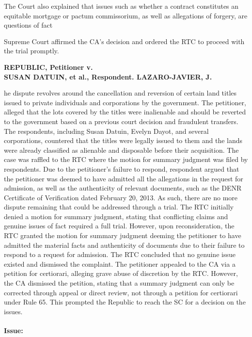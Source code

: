 \documentclass[
12pt,
oneside,
onehalfspacing,
headsepline
]{DigestCollection}
\begin{document}
The Court also explained that issues such as whether a contract constitutes an equitable mortgage or pactum commissorium, as well as allegations of forgery, are questions of fact 

Supreme Court affirmed the CA's decision and ordered the RTC to proceed with the trial promptly.

\label{fb229820-0a29-11ef-a1a5-03b0bde1fccf}


\noindent\textbf{REPUBLIC, Petitioner v. \\SUSAN DATUIN, et al., Respondent. LAZARO-JAVIER, J.}\vspace{0.4cm}

he dispute revolves around the cancellation and reversion of certain land titles issued to private individuals and corporations by the government. The petitioner, alleged that the lots covered by the titles were inalienable and should be reverted to the government based on a previous court decision and fraudulent transfers. The respondents, including Susan Datuin, Evelyn Dayot, and several corporations, countered that the titles were legally issued to them and the lands were already classified as alienable and disposable before their acquisition. The case was raffled to the RTC where the motion for summary judgment was filed by respondents. Due to the petitioner's failure to respond, respondent argued that the petitioner was deemed to have admitted all the allegations in the request for admission, as well as the authenticity of relevant documents, such as the DENR Certificate of Verification dated February 20, 2013. As such, there are no more dispute remaining that could be addressed through a trial. The RTC initially denied a motion for summary judgment, stating that conflicting claims and genuine issues of fact required a full trial. However, upon reconsideration, the RTC granted the motion for summary judgment deeming the petitioner to have admitted the material facts and authenticity of documents due to their failure to respond to a request for admission. The RTC concluded that no genuine issue existed and dismissed the complaint. The petitioner appealed to the CA via a petition for certiorari, alleging grave abuse of discretion by the RTC. However, the CA dismissed the petition, stating that a summary judgment can only be corrected through appeal or direct review, not through a petition for certiorari under Rule 65. This prompted the Republic to reach the SC for a decision on the issues.

\paragraph{Issue:}
\label{186e9910-1236-11ef-aa24-9916ea601717}
\end{document}
